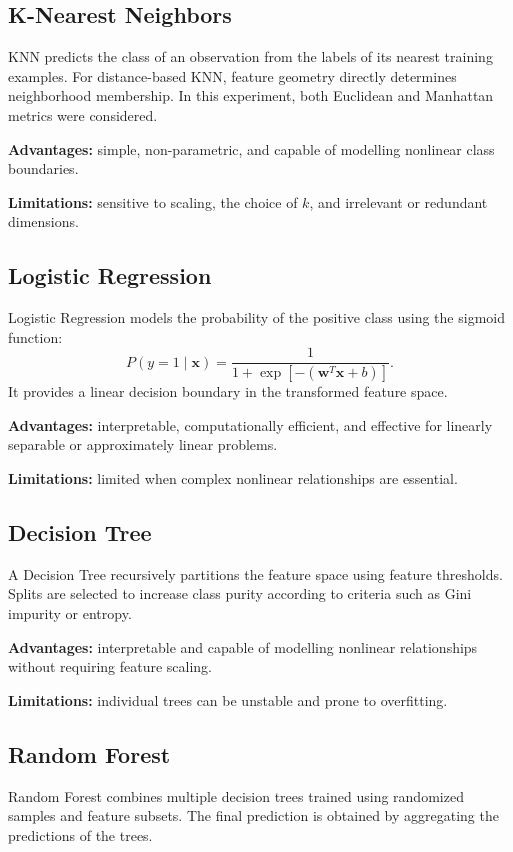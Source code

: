 \documentclass[12pt,a4paper]{article}
\begin{document}
\subsection{K-Nearest Neighbors}
KNN predicts the class of an observation from the labels of its nearest training examples. For distance-based KNN, feature geometry directly determines neighborhood membership. In this experiment, both Euclidean and Manhattan metrics were considered.

\textbf{Advantages:} simple, non-parametric, and capable of modelling nonlinear class boundaries.

\textbf{Limitations:} sensitive to scaling, the choice of $k$, and irrelevant or redundant dimensions.

\subsection{Logistic Regression}
Logistic Regression models the probability of the positive class using the sigmoid function:
\[
P(y=1\mid\mathbf{x})=\frac{1}{1+\exp[-(\mathbf{w}^{T}\mathbf{x}+b)]}.
\]
It provides a linear decision boundary in the transformed feature space.

\textbf{Advantages:} interpretable, computationally efficient, and effective for linearly separable or approximately linear problems.

\textbf{Limitations:} limited when complex nonlinear relationships are essential.

\subsection{Decision Tree}
A Decision Tree recursively partitions the feature space using feature thresholds. Splits are selected to increase class purity according to criteria such as Gini impurity or entropy.

\textbf{Advantages:} interpretable and capable of modelling nonlinear relationships without requiring feature scaling.

\textbf{Limitations:} individual trees can be unstable and prone to overfitting.

\subsection{Random Forest}
Random Forest combines multiple decision trees trained using randomized samples and feature subsets. The final prediction is obtained by aggregating the predictions of the trees.
\end{document}

